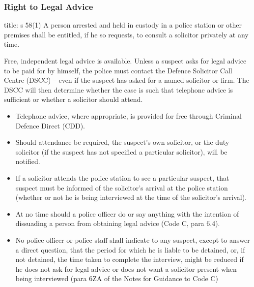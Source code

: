 \documentclass[
]{article}
\newenvironment{Shaded}{}{}
\newcommand{\NormalTok}[1]{#1}
\providecommand{\tightlist}{%
  \setlength{\itemsep}{0pt}\setlength{\parskip}{0pt}}
\begin{document}
\hypertarget{right-to-legal-advice}{%
\subsubsection{Right to Legal Advice}\label{right-to-legal-advice}}

\begin{Shaded}
\begin{Highlighting}[]
\NormalTok{title: s 58(1)}
\NormalTok{A person arrested and held in custody in a police station or other premises shall be entitled, if he so requests, to consult a solicitor privately at any time.}
\end{Highlighting}
\end{Shaded}

Free, independent legal advice is available. Unless a suspect asks for
legal advice to be paid for by himself, the police must contact the
Defence Solicitor Call Centre (DSCC) -- even if the suspect has asked
for a named solicitor or firm. The DSCC will then determine whether the
case is such that telephone advice is sufficient or whether a solicitor
should attend.

\begin{itemize}
\tightlist
\item
  Telephone advice, where appropriate, is provided for free through
  Criminal Defence Direct (CDD).
\item
  Should attendance be required, the suspect's own solicitor, or the
  duty solicitor (if the suspect has not specified a particular
  solicitor), will be notified.
\item
  If a solicitor attends the police station to see a particular suspect,
  that suspect must be informed of the solicitor's arrival at the police
  station (whether or not he is being interviewed at the time of the
  solicitor's arrival).
\item
  At no time should a police officer do or say anything with the
  intention of dissuading a person from obtaining legal advice (Code C,
  para 6.4).
\item
  No police officer or police staff shall indicate to any suspect,
  except to answer a direct question, that the period for which he is
  liable to be detained, or, if not detained, the time taken to complete
  the interview, might be reduced if he does not ask for legal advice or
  does not want a solicitor present when being interviewed (para 6ZA of
  the Notes for Guidance to Code C)
\end{itemize}
\end{document}
